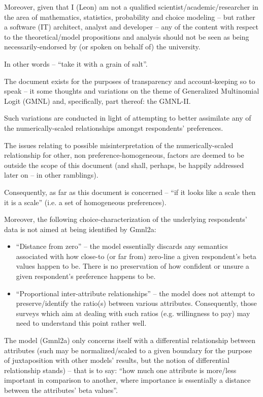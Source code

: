 \documentclass[12pt,a4paper]{article}
\begin{document}
Moreover, given that I (Leon) am not a qualified scientist/academic/researcher in the area of mathematics, statistics, probability and choice modeling -- but rather a software (IT) architect, analyst and developer -- any of the content with respect to the theoretical/model propositions and analysis should not be seen as being necessarily-endorsed by (or spoken on behalf of) the university. 

In other words -- ``take it with a grain of salt''.

The document exists for the purposes of transparency and account-keeping so to speak -- it some thoughts and variations on the theme of Generalized Multinomial Logit (GMNL) and, specifically, part thereof: the GMNL-II. 

Such variations are conducted in light of attempting to better assimilate any of the numerically-scaled relationships amongst respondents' preferences.

The issues relating to possible misinterpretation of the numerically-scaled relationship for other, non preference-homogeneous, factors are deemed to be outside the scope of this document (and shall, perhaps, be happily addressed later on -- in other ramblings). 

Consequently, as far as this document is concerned -- ``if it looks like a scale then it is a scale'' (i.e. a set of homogeneous preferences).

Moreover, the following choice-characterization of the underlying respondents' data is not aimed at being identified by Gmnl2a:
\begin{itemize}
\item ``Distance from zero'' -- the model essentially discards any semantics associated with how close-to (or far from) zero-line a given respondent's beta values happen to be. There is no preservation of how confident or unsure a given respondent's preference happens to be.
\item ``Proportional inter-attribute relationships'' -- the model does not attempt to preserve/identify the ratio(s) between various attributes. Consequently, those surveys which aim at dealing with such ratios (e.g. willingness to pay) may need to understand this point rather well. 
\end{itemize}

The model (Gmnl2a) only concerns itself with a differential relationship between attributes (such may be normalized/scaled to a given boundary for the purpose of juxtaposition with other models' results, but the notion of differential relationship stands) -- that is to say: ``how much one attribute is more/less important in comparison to another, where importance is essentially a distance between the attributes' beta values''.
\end{document}
